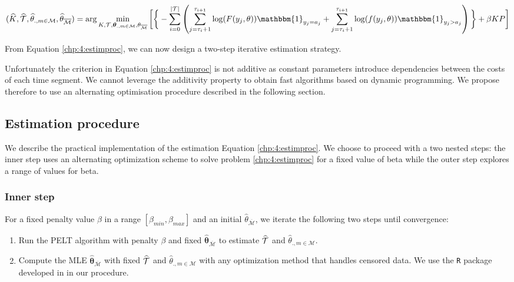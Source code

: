 \begin{dmath}\label{chp:4:estimproc}
(\widehat{K},\widehat{\TT},\widehat{\theta}_{.,m\in\mathcal{M}},\widehat{\theta}_{\overline{\mathcal{M}}}) = \arg\min_{K,\TT,\bm \theta_{.,m\in\mathcal{M}},\theta_{\overline{\mathcal{M}}}}\bigg[\bigg\{ - \sum_{i=0}^{\lvert \TT \rvert}  \left(\sum_{j=\tau_i+1}^{\tau_{i+1}}\log(F(y_j,\theta))\mathbbm{1}_{y_j=a_j}+\sum_{j=\tau_i+1}^{\tau_{i+1}}\log(f(y_j,\theta))\mathbbm{1}_{y_j>a_j}\right)\bigg\}+\beta KP \bigg]
\end{dmath}

From Equation \eqref{chp:4:estimproc}, we can now design a two-step iterative estimation strategy.

Unfortunately the criterion in Equation \eqref{chp:4:estimproc} is not additive as constant parameters introduce dependencies between the costs of each time segment. We cannot leverage the additivity property to obtain fast algorithms based on dynamic programming. We propose therefore to use an alternating optimisation procedure described in the following section. 

\subsection{Estimation procedure}\label{chp:4:3:2}


We describe the practical implementation of the estimation Equation \eqref{chp:4:estimproc}. We choose to proceed with a two nested steps: the inner step uses an alternating optimization scheme to solve problem \eqref{chp:4:estimproc} for a fixed value of beta while the outer step explores a range of values for beta.

\subsubsection{Inner step}\label{chp:4:3:2:1}

For a fixed penalty value $\beta$ in a range $[\beta_{min},\beta_{max}]$ and an initial $\widehat{\theta}_{\overline{\mathcal{M}}}$, we iterate the following two steps until convergence: 
\begin{enumerate}
\item Run the PELT algorithm with penalty $\beta$ and fixed $\widehat{\bm\theta}_{{\overline{\mathcal{M}}}}$ to estimate $\widehat{{\mathcal T}}$ and $\widehat{\theta}_{.,m\in\mathcal{M}}$.
\item Compute the MLE $\widehat{\bm\theta}_{{\overline{\mathcal{M}}}}$ with fixed $\widehat{{\mathcal T}}$ and $\widehat{\theta}_{.,m\in\mathcal{M}}$ with any optimization method that handles censored data. We use the \texttt{R} package developed in \cite{delignette2015} in our procedure.  
\end{enumerate} 

